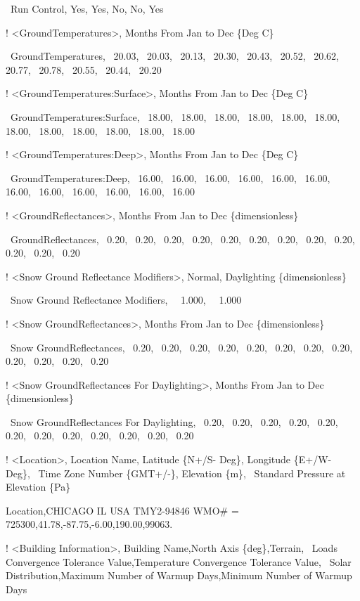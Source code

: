 ~Run Control, Yes, Yes, No, No, Yes

! \textless{}GroundTemperatures\textgreater{}, Months From Jan to Dec \{Deg C\}

~GroundTemperatures,~ 20.03,~ 20.03,~ 20.13,~ 20.30,~ 20.43,~ 20.52,~ 20.62,~ 20.77,~ 20.78,~ 20.55,~ 20.44,~ 20.20

! \textless{}GroundTemperatures:Surface\textgreater{}, Months From Jan to Dec \{Deg C\}

~GroundTemperatures:Surface,~ 18.00,~ 18.00,~ 18.00,~ 18.00,~ 18.00,~ 18.00,~ 18.00,~ 18.00,~ 18.00,~ 18.00,~ 18.00,~ 18.00

! \textless{}GroundTemperatures:Deep\textgreater{}, Months From Jan to Dec \{Deg C\}

~GroundTemperatures:Deep,~ 16.00,~ 16.00,~ 16.00,~ 16.00,~ 16.00,~ 16.00,~ 16.00,~ 16.00,~ 16.00,~ 16.00,~ 16.00,~ 16.00

! \textless{}GroundReflectances\textgreater{}, Months From Jan to Dec \{dimensionless\}

~GroundReflectances,~ 0.20,~ 0.20,~ 0.20,~ 0.20,~ 0.20,~ 0.20,~ 0.20,~ 0.20,~ 0.20,~ 0.20,~ 0.20,~ 0.20

! \textless{}Snow Ground Reflectance Modifiers\textgreater{}, Normal, Daylighting \{dimensionless\}

~Snow Ground Reflectance Modifiers,~~ 1.000,~~ 1.000

! \textless{}Snow GroundReflectances\textgreater{}, Months From Jan to Dec \{dimensionless\}

~Snow GroundReflectances,~ 0.20,~ 0.20,~ 0.20,~ 0.20,~ 0.20,~ 0.20,~ 0.20,~ 0.20,~ 0.20,~ 0.20,~ 0.20,~ 0.20

! \textless{}Snow GroundReflectances For Daylighting\textgreater{}, Months From Jan to Dec \{dimensionless\}

~Snow GroundReflectances For Daylighting,~ 0.20,~ 0.20,~ 0.20,~ 0.20,~ 0.20,~ 0.20,~ 0.20,~ 0.20,~ 0.20,~ 0.20,~ 0.20,~ 0.20

! \textless{}Location\textgreater{}, Location Name, Latitude \{N+/S- Deg\}, Longitude \{E+/W- Deg\},~ Time Zone Number \{GMT+/-\}, Elevation \{m\},~ Standard Pressure at Elevation \{Pa\}

Location,CHICAGO IL USA TMY2-94846 WMO\# = 725300,41.78,-87.75,-6.00,190.00,99063.

! \textless{}Building Information\textgreater{}, Building Name,North Axis \{deg\},Terrain,~ Loads Convergence Tolerance Value,Temperature Convergence Tolerance Value,~ Solar Distribution,Maximum Number of Warmup Days,Minimum Number of Warmup Days

